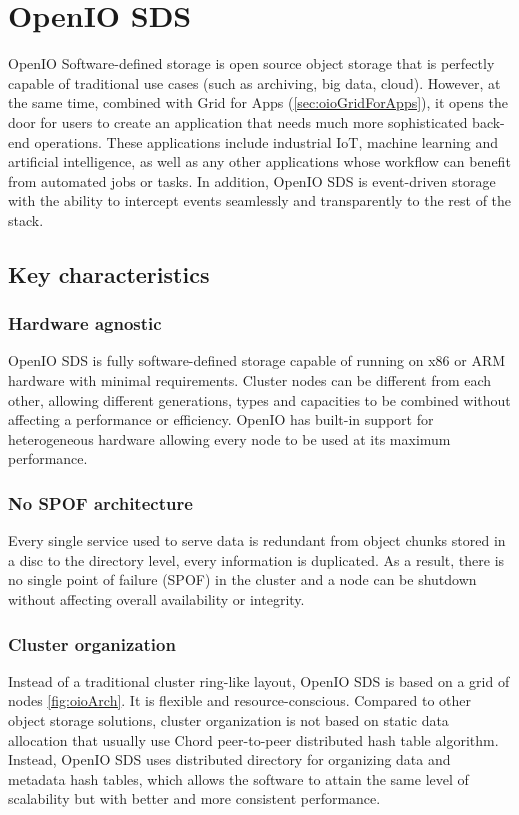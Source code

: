 \chapter{OpenIO SDS}
    OpenIO Software-defined storage is open source object storage that is perfectly capable of traditional use cases (such as archiving, big data, cloud). However, at the same time, combined with Grid for Apps (\ref{sec:oioGridForApps}), it opens the door for users to create an application that needs much more sophisticated back-end operations. These applications include industrial IoT, machine learning and artificial intelligence, as well as any other applications whose workflow can benefit from automated jobs or tasks\cite{oioNextGen}. In addition, OpenIO SDS is event-driven storage with the ability to intercept events seamlessly and transparently to the rest of the stack.

    \section{Key characteristics}
    \subsection*{Hardware agnostic}
    OpenIO SDS is fully software-defined storage capable of running on x86 or ARM hardware with minimal requirements. Cluster nodes can be different from each other, allowing different generations, types and capacities to be combined without affecting a performance or efficiency\cite{oioKeyChars}.
    OpenIO has built-in support for heterogeneous hardware allowing every node to be used at its maximum performance.
    \subsection*{No SPOF architecture}
    Every single service used to serve data is redundant from object chunks stored in a disc to the directory level, every information is duplicated. As a result, there is no single point of failure (SPOF) in the cluster and a node can be shutdown without affecting overall availability or integrity\cite{oioCoreSolution}.
    \subsection*{Cluster organization}
    Instead of a traditional cluster ring-like layout, OpenIO SDS is based on a grid of nodes \ref{fig:oioArch}. It is flexible and resource-conscious. Compared to other object storage solutions, cluster organization is not based on static data allocation that usually use Chord peer-to-peer distributed hash table algorithm. Instead, OpenIO SDS uses distributed directory for organizing data and metadata hash tables, which allows the software to attain the same level of scalability but with better and more consistent performance\cite{oioKeyChars}.

